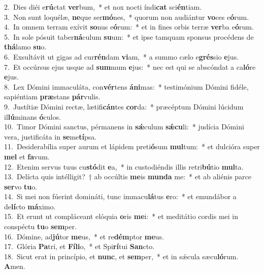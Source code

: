 {2.~}Dies diéi e\textbf{rú}ctat \textbf{ver}bum,~* et nox nocti índi\textbf{cat} sci\textbf{én}tiam.\\
{3.~}Non sunt loquélæ, \textbf{ne}que ser\textbf{mó}nes,~* quorum non audiántur \textbf{vo}ces e\textbf{ó}rum.\\
{4.~}In omnem terram exívit \textbf{so}nus e\textbf{ó}rum:~* et in fines orbis terræ \textbf{ver}ba e\textbf{ó}rum.\\
{5.~}In sole pósuit taber\textbf{ná}culum \textbf{su}um:~* et ipse tamquam sponsus procédens de \textbf{thá}lamo \textbf{su}o.\\
{6.~}Exsultávit ut gigas ad cur\textbf{rén}dam \textbf{vi}am,~* a summo cælo e\textbf{grés}sio \textbf{e}jus.\\
{7.~}Et occúrsus ejus usque ad \textbf{sum}mum \textbf{e}jus:~* nec est qui se abscóndat a ca\textbf{ló}re \textbf{e}jus.\\
{8.~}Lex Dómini immaculáta, con\textbf{vér}tens \textbf{á}\textbf{ni}mas:~* testimónium Dómini fidéle, sapiéntiam \textbf{præ}stans \textbf{pár}vulis.\\
{9.~}Justítiæ Dómini rectæ, lætifi\textbf{cán}tes \textbf{cor}da:~* præcéptum Dómini lúcidum il\textbf{lú}minans \textbf{ó}culos.\\
{10.~}Timor Dómini sanctus, pérmanens in \textbf{sǽ}culum \textbf{sǽ}\textbf{cu}li:~* judícia Dómini vera, justificáta in \textbf{se}me\textbf{tí}psa.\\
{11.~}Desiderabília super aurum et lápidem preti\textbf{ó}sum \textbf{mul}tum:~* et dulcióra super \textbf{mel} et \textbf{fa}vum.\\
{12.~}Etenim servus tuus cu\textbf{stó}dit \textbf{e}a,~* in custodiéndis illis retri\textbf{bú}tio \textbf{mul}ta.\\
{13.~}Delícta quis intélligit?~† ab occúltis \textbf{me}is \textbf{mun}\textbf{da} me:~* et ab aliénis parce \textbf{ser}vo \textbf{tu}o.\\
{14.~}Si mei non fúerint domináti, tunc immacu\textbf{lá}tus \textbf{e}ro:~* et emundábor a de\textbf{lí}cto \textbf{má}ximo.\\
{15.~}Et erunt ut compláceant elóquia \textbf{o}ris \textbf{me}i:~* et meditátio cordis mei in conspéctu \textbf{tu}o \textbf{sem}per.\\
{16.~}Dómine, ad\textbf{jú}tor \textbf{me}us,~* et re\textbf{dém}ptor \textbf{me}us.\\
{17.~}Glória \textbf{Pa}tri, et \textbf{Fí}\textbf{li}o,~* et Spi\textbf{rí}tui \textbf{San}cto.\\
{18.~}Sicut erat in princípio, et \textbf{nunc}, et \textbf{sem}per,~* et in sǽcula sæcu\textbf{ló}rum. \textbf{A}men.\\
